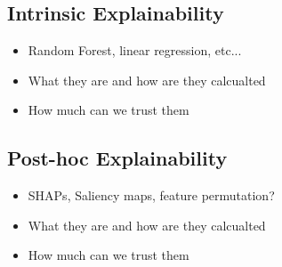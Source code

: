 \subsection{Intrinsic Explainability}\label{subsec:method-intrinsic-explainability}
\begin{itemize}
    \item Random Forest, linear regression, etc...
    \item What they are and how are they calcualted
    \item How much can we trust them
\end{itemize}

\subsection{Post-hoc Explainability}\label{subsec:method-posthoc-explainability}
\begin{itemize}
    \item SHAPs, Saliency maps, feature permutation?
    \item What they are and how are they calcualted
    \item How much can we trust them
\end{itemize}

